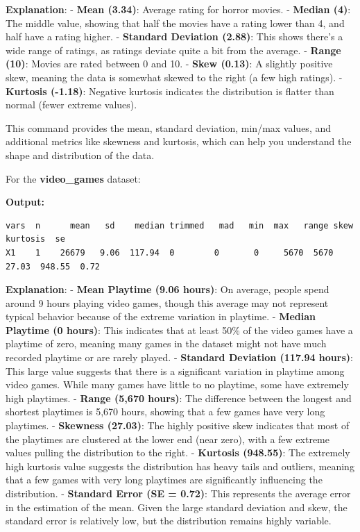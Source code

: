 \documentclass[
]{book}
\newenvironment{Shaded}{\begin{snugshade}}{\end{snugshade}}
\newcommand{\CommentTok}[1]{\textcolor[rgb]{0.56,0.35,0.01}{\textit{#1}}}
\newcommand{\FunctionTok}[1]{\textcolor[rgb]{0.13,0.29,0.53}{\textbf{#1}}}
\newcommand{\NormalTok}[1]{#1}
\newcommand{\SpecialCharTok}[1]{\textcolor[rgb]{0.81,0.36,0.00}{\textbf{#1}}}
\begin{document}
\textbf{Explanation}:
- \textbf{Mean (3.34)}: Average rating for horror movies.
- \textbf{Median (4)}: The middle value, showing that half the movies have a rating lower than 4, and half have a rating higher.
- \textbf{Standard Deviation (2.88)}: This shows there's a wide range of ratings, as ratings deviate quite a bit from the average.
- \textbf{Range (10)}: Movies are rated between 0 and 10.
- \textbf{Skew (0.13)}: A slightly positive skew, meaning the data is somewhat skewed to the right (a few high ratings).
- \textbf{Kurtosis (-1.18)}: Negative kurtosis indicates the distribution is flatter than normal (fewer extreme values).

This command provides the mean, standard deviation, min/max values, and additional metrics like skewness and kurtosis, which can help you understand the shape and distribution of the data.

For the \textbf{video\_games} dataset:

\begin{Shaded}
\end{Shaded}

\textbf{Output:}

\begin{verbatim}
vars  n      mean   sd    median trimmed   mad   min  max   range skew  kurtosis  se
X1    1    26679   9.06  117.94  0        0       0     5670  5670  27.03  948.55  0.72
\end{verbatim}

\textbf{Explanation}:
- \textbf{Mean Playtime (9.06 hours)}: On average, people spend around 9 hours playing video games, though this average may not represent typical behavior because of the extreme variation in playtime.
- \textbf{Median Playtime (0 hours)}: This indicates that at least 50\% of the video games have a playtime of zero, meaning many games in the dataset might not have much recorded playtime or are rarely played.
- \textbf{Standard Deviation (117.94 hours)}: This large value suggests that there is a significant variation in playtime among video games. While many games have little to no playtime, some have extremely high playtimes.
- \textbf{Range (5,670 hours)}: The difference between the longest and shortest playtimes is 5,670 hours, showing that a few games have very long playtimes.
- \textbf{Skewness (27.03)}: The highly positive skew indicates that most of the playtimes are clustered at the lower end (near zero), with a few extreme values pulling the distribution to the right.
- \textbf{Kurtosis (948.55)}: The extremely high kurtosis value suggests the distribution has heavy tails and outliers, meaning that a few games with very long playtimes are significantly influencing the distribution.
- \textbf{Standard Error (SE = 0.72)}: This represents the average error in the estimation of the mean. Given the large standard deviation and skew, the standard error is relatively low, but the distribution remains highly variable.
\end{document}
